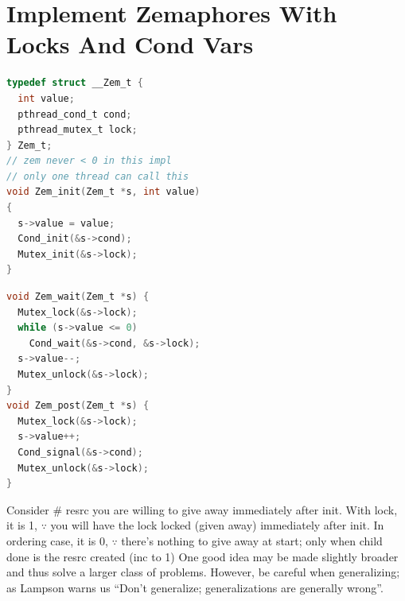 \section*{Implement Zemaphores With Locks And Cond Vars}
\begin{minipage}{.5\linewidth}
\begin{lstlisting}[language=c,xrightmargin=2pt]
typedef struct __Zem_t {
  int value;
  pthread_cond_t cond;
  pthread_mutex_t lock;
} Zem_t;
// zem never < 0 in this impl
// only one thread can call this
void Zem_init(Zem_t *s, int value)
{
  s->value = value;
  Cond_init(&s->cond);
  Mutex_init(&s->lock);
}
\end{lstlisting}
\end{minipage}
\begin{minipage}{.5\linewidth}
\begin{lstlisting}[language=c,xleftmargin=4pt]
void Zem_wait(Zem_t *s) {
  Mutex_lock(&s->lock);
  while (s->value <= 0)
    Cond_wait(&s->cond, &s->lock);
  s->value--;
  Mutex_unlock(&s->lock);
}
void Zem_post(Zem_t *s) {
  Mutex_lock(&s->lock);
  s->value++;
  Cond_signal(&s->cond);
  Mutex_unlock(&s->lock);
}
\end{lstlisting}
\end{minipage}
\begin{tcolorbox}[left=0mm, top=1mm, right=0mm, rightlower=0mm, bottom=1mm,
  title=Setting the value of a semaphore,
  halign title=center]
  Consider \# resrc you are willing to give away immediately after init. With lock, it is 1, $\because$ you will have the lock locked (given away) immediately after init. In ordering case, it is 0, $\because$ there's nothing to give away at start; only when child done is the resrc created (inc to 1)
  \tcblower
One good idea may be made slightly broader and thus solve a larger class of problems. However, be careful when generalizing; as Lampson warns us ``Don't generalize; generalizations are generally wrong''.
\end{tcolorbox}
